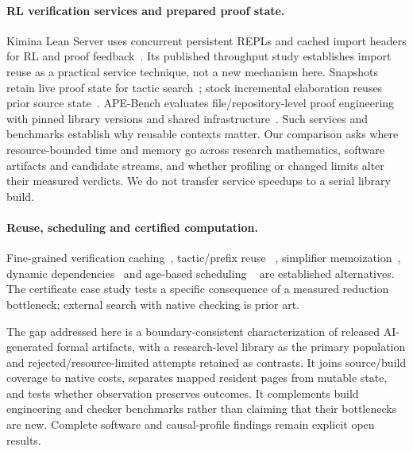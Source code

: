 \documentclass[10pt,twocolumn]{article}
\begin{document}
\paragraph{RL verification services and prepared proof state.}
Kimina Lean Server uses concurrent persistent REPLs and cached import headers
for RL and proof feedback~\cite{kimina,kiminaPaper}.
Its published throughput study establishes import reuse as a practical
service technique, not a new mechanism here.
Snapshots retain live proof state for tactic search~\cite{leanSnapshot};
stock incremental elaboration reuses prior source state~\cite{leanIncremental}.
APE-Bench evaluates file/repository-level proof engineering with pinned
library versions and shared infrastructure~\cite{apeBench2026}.
Such services and benchmarks establish why reusable contexts matter.
Our comparison asks where resource-bounded time and memory go across
research mathematics, software artifacts and candidate streams, and whether
profiling or changed limits alter their measured verdicts.
We do not transfer service speedups to a serial library build.

\paragraph{Reuse, scheduling and certified computation.}
Fine-grained verification caching~\cite{boogieCache}, tactic/prefix reuse
~\cite{tactician2020,shred}, simplifier memoization~\cite{leanSimpCache},
dynamic dependencies~\cite{salsaDependencies,adapton} and age-based scheduling
~\cite{lubyRestart1993,soap2018} are established alternatives.
The certificate case study tests a specific consequence of a measured
reduction bottleneck; external search with native checking is prior art.

The gap addressed here is a boundary-consistent characterization of released
AI-generated formal artifacts, with a research-level library as the primary
population and rejected/resource-limited attempts retained as contrasts.
It joins source/build coverage to native costs, separates mapped resident
pages from mutable state, and tests whether observation preserves outcomes.
It complements build engineering and checker benchmarks rather than claiming
that their bottlenecks are new. Complete software and causal-profile
findings remain explicit open results.
\end{document}
